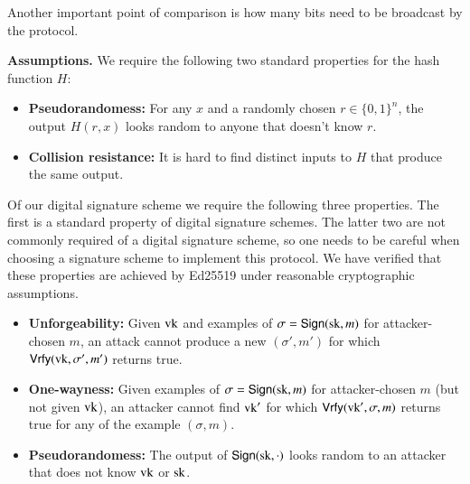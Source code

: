 Another important point of comparison is how many bits need to be broadcast by the protocol.

{\bf Assumptions.} We require the following two standard properties for the hash function $H$:
\begin{itemize}
	\item \textbf{Pseudorandomess:} For any $x$ and a randomly chosen $r\in\{0,1\}^n$, the output $H(r,x)$ looks random to anyone that doesn't know $r$.
	\item \textbf{Collision resistance:} It is hard to find distinct inputs to $H$ that produce the same output.
\end{itemize}
Of our digital signature scheme we require the following three properties. The first is a standard property of digital signature schemes. The latter two are not commonly required of a digital signature scheme, so one needs to be careful when choosing a signature scheme to implement this protocol. We have verified that these properties are achieved by Ed25519 under reasonable cryptographic assumptions. 
\begin{itemize}
	\item \textbf{Unforgeability:} Given $\mathrm{vk}$ and examples of $\sigma=\mathsf{Sign}(\mathrm{sk},m)$ for attacker-chosen $m$, an attack cannot produce a new $(\sigma',m')$ for which $\mathsf{Vrfy}(\mathrm{vk}, \sigma', m')$ returns true.
	\item \textbf{One-wayness:}	Given examples of $\sigma=\mathsf{Sign}(\mathrm{sk},m)$ for attacker-chosen $m$ (but not given $\mathrm{vk}$), an attacker cannot find $\mathrm{vk}'$ for which $\mathsf{Vrfy}(\mathrm{vk}', \sigma, m )$ returns true for any of the example $(\sigma,m)$.
	\item \textbf{Pseudorandomess:} The output of $\mathsf{Sign}(\mathrm{sk},\cdot)$ looks random to an attacker that does not know $\mathrm{vk}$ or $\mathrm{sk}$.
\end{itemize}

